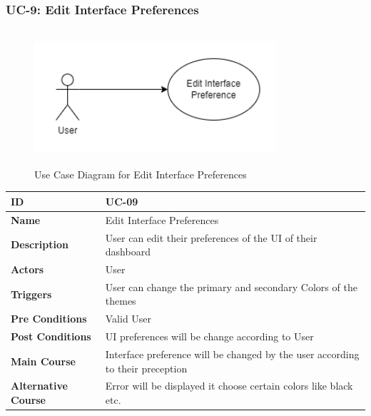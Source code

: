     \subsubsection{UC-9: Edit Interface Preferences}
    \begin{figure}[H]
        \includegraphics[height=5cm, width=0.8\textwidth]{./diagrams/Use Case/u9.png}
        \centering 
        \caption{Use Case Diagram for Edit Interface Preferences}
        \label{fig:Usecase1}
        \end{figure}
        
    \begin{center}
        \begin{tabularx}{\textwidth}{|l|X|}
            \hline
            \textbf{ID} & UC-09 \\
            \hline
            \textbf{Name} & Edit Interface Preferences \\
            \hline
            \textbf{Description} & User can edit their preferences of the UI of their dashboard \\
            \hline
            \textbf{Actors} & User \\
            \hline
            \textbf{Triggers} & User can change the primary and secondary Colors of the themes \\
            \hline
            \textbf{Pre Conditions} & Valid User \\
            \hline
            \textbf{Post Conditions} & UI preferences will be change according to User \\
            \hline
            \textbf{Main Course} & Interface preference will be changed by the user according to their preception  \\
            \hline
            \textbf{Alternative Course} & Error will be displayed it choose certain colors like black etc. \\
            \hline
            
        \end{tabularx}
    \end{center}
    \newpage
    


